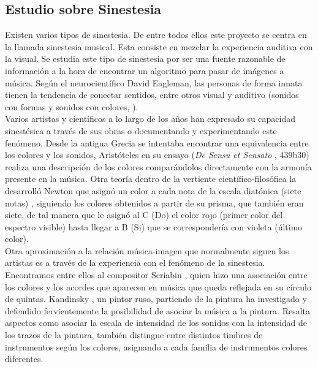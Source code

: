 \subsection{Estudio sobre Sinestesia}
\label{subsubsec:estudioSinestesia}


Existen varios tipos de sinestesia. De entre todos ellos este proyecto se centra en la llamada sinestesia musical. Esta consiste en mezclar la experiencia auditiva con la visual. Se estudia este tipo de sinestesia por ser una fuente razonable de información a la hora de encontrar un algoritmo para pasar de imágenes a música. Según el neurocientífico David Eagleman, las personas de forma innata tienen la tendencia de conectar sentidos, entre otros visual y auditivo (sonidos con formas y sonidos con colores, \cite{VideoRedesFliparColores}).\\

Varios artistas y científicos a lo largo de los años han expresado su capacidad sinestésica a través de sus obras o documentando y experimentando este fenómeno. Desde la antigua Grecia se intentaba encontrar una equivalencia entre los colores y los sonidos, Aristóteles en su ensayo (\emph{De Sensu et Sensato} \cite{DeSensuEtSensato}, 439b30) realiza una descripción de los colores comparándolos directamente con la armonía presente en la música. Otra teoría dentro de la vertiente científico-filosófica la desarrolló Newton que asignó un color a cada nota de la escala diatónica (siete notas) \cite{OpticksNewton}, siguiendo los colores obtenidos a partir de su prisma, que también eran siete, de tal manera que le asignó al C (Do) el color rojo (primer color del espectro visible) hasta llegar a B (Si) que se correspondería con violeta (último color).\\ 

Otra aproximación a la relación música-imagen que normalmente siguen los artistas es a través de la experiencia con el fenómeno de la sinestesia. Encontramos entre ellos al compositor Scriabin \cite{ScriabinQuintasColor}, quien hizo una asociación entre los colores y los acordes que aparecen en música que queda reflejada en su círculo de quintas. Kandinsky \cite{ConcerningSpiritualArt}, un pintor ruso, partiendo de la pintura ha investigado y defendido fervientemente la posibilidad de asociar la música a la pintura. Resalta aspectos como asociar la escala de intensidad de los sonidos con la intensidad de los trazos de la pintura, también distingue entre distintos timbres de instrumentos según los colores, asignando a cada familia de instrumentos colores diferentes.\\

